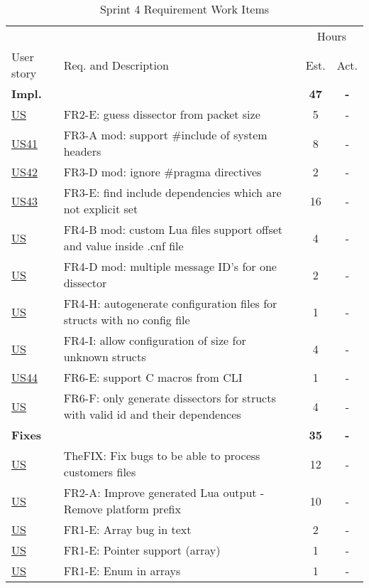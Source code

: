 \begin{table}[!htb] \small \center
\caption{Sprint 4 Requirement Work Items \label{tab:sprint4req}}
\begin{tabularx}{\textwidth}{l X c c}
	\toprule
	& & \multicolumn{2}{c}{Hours} \\
	\cmidrule(r){3-4}
	User story & Req. and Description & Est. & Act. \\
	\midrule
	\textbf{Impl.} &  & \textbf{47} & \textbf{-} \\
	\hyperref[tab:req:stories]{US} & FR2-E: guess dissector from packet size & 5 & - \\
	\hyperref[tab:req:stories10]{US41} & FR3-A mod: support \#include of system headers &  8  & - \\
	\hyperref[tab:req:stories10]{US42} & FR3-D mod: ignore \#pragma directives & 2 & - \\
	\hyperref[tab:req:stories10]{US43} & FR3-E: find include dependencies which are not explicit set & 16  & - \\
	\hyperref[tab:req:stories]{US} & FR4-B mod: custom Lua files support offset and value inside .cnf file & 4 & - \\
	\hyperref[tab:req:stories]{US} & FR4-D mod: multiple message ID's for one dissector & 2 & - \\
	\hyperref[tab:req:stories]{US} & FR4-H: autogenerate configuration files for structs with no config file & 1  & - \\
	\hyperref[tab:req:stories]{US} & FR4-I: allow configuration of size for unknown structs & 4 & - \\
	\hyperref[tab:req:stories10]{US44} & FR6-E: support C macros from CLI & 1 & - \\
	\hyperref[tab:req:stories]{US} & FR6-F: only generate dissectors for structs with valid id and their dependences & 4 & - \\
	\addlinespace
	\textbf{Fixes} &  & \textbf{35} & \textbf{-} \\
	\hyperref[tab:req:stories]{US} & TheFIX: Fix bugs to be able to process customers files & 12 & - \\
	\hyperref[tab:req:stories]{US} & FR2-A: Improve generated Lua output - Remove platform prefix & 10 & - \\
	\hyperref[tab:req:stories]{US} & FR1-E: Array bug in text & 2 & - \\
	\hyperref[tab:req:stories]{US} & FR1-E: Pointer support (array) & 1 & - \\
	\hyperref[tab:req:stories]{US} & FR1-E: Enum in arrays & 1 & - \\		

\end{tabularx}
\end{table}
